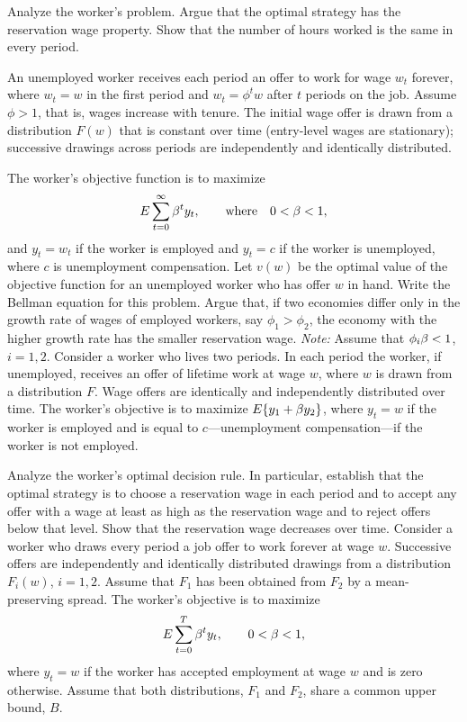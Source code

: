 Analyze the worker's problem.  Argue that the optimal strategy has the
reservation wage property. Show that the number of hours worked is the same in
every period.

\medskip
{}
\medskip
\noindent An unemployed worker receives each period an offer to work for wage $w_t$
forever, where $w_t=w$ in the first period and $w_t=\phi^tw$ after
 $t$ periods on
the job.  Assume $\phi>1$, that is, wages increase with tenure.  The initial
wage offer is drawn from a distribution $F(w)$ that is constant over time
(entry-level wages are stationary); successive drawings across periods are
independently and identically distributed.

The worker's objective function is to maximize
$$E\sum_{t=0}^\infty {\beta}^t y_t,\qquad {\rm where}\quad 0<{\beta}<1,$$
and $y_t=w_t$ if the worker is employed and $y_t=c$ if the worker is
unemployed, where $c$ is unemployment compensation.  Let $v(w)$ be the optimal
value of the objective function for an unemployed worker who has offer $w$ in
hand.  Write the Bellman equation for this problem.  Argue that, if two economies
differ only in the growth rate of wages of employed workers, say
$\phi_1>\phi_2$, the economy with the higher growth rate has the smaller
reservation wage.
{\it Note:} Assume that $\phi_i{\beta} <1$, $i=1,2$.
\medskip
{}
\medskip
\noindent Consider a worker who lives two periods.  In each period the worker, if
unemployed, receives an offer of lifetime work at wage $w$, where $w$ is drawn
from a distribution $F$.  Wage offers are identically and independently
distributed over time.  The worker's objective is to maximize $E\{y_1+{\beta}
y_2\}$, where $y_t=w$ if the worker is employed and is equal to
$c$---unemployment compensation---if the worker is not employed.

Analyze the worker's optimal decision rule.  In particular, establish that the
optimal strategy is to choose a reservation wage in each period and to accept
any offer with a wage at least as high as the reservation wage and to reject
offers below that level.  Show that the reservation wage decreases over time.
\medskip
{}
\medskip
\noindent Consider a worker who draws every period a job offer to work forever at wage
$w$.  Successive offers are independently and identically distributed drawings
from a distribution $F_i(w)$, $i=1,2$.  Assume that $F_1$ has been obtained
from $F_2$ by a mean-preserving spread.  The worker's
objective is to maximize
$$E \sum_{t=0}^T {\beta}^t y_t,\qquad 0<{\beta} <1,$$
where $y_t=w$ if the worker has accepted employment at wage $w$ and is zero
otherwise.  Assume that both distributions, $F_1$ and $F_2$, share a common
upper bound, $B$.

